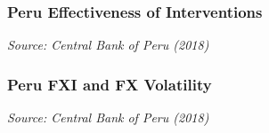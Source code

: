\documentclass{beamer}
\begin{document}
\begin{frame}
\frametitle{Peru Effectiveness of Interventions}
\medskip
\emph{Source: Central Bank of Peru (2018)}
\end{frame}


\begin{frame}
\frametitle{Peru FXI and FX Volatility}
\medskip
\emph{Source: Central Bank of Peru (2018)}
\end{frame}
\end{document}
